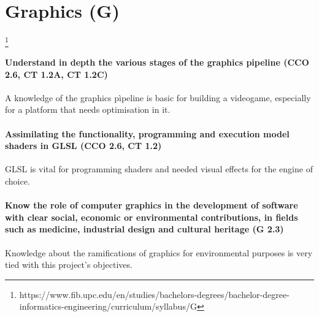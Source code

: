 \section{Graphics (G)}

\footnote{https://www.fib.upc.edu/en/studies/bachelors-degrees/bachelor-degree-informatics-engineering/curriculum/syllabus/G}

\paragraph{Understand in depth the various stages of the graphics pipeline (CCO 2.6, CT 1.2A, CT 1.2C)}
A knowledge of the graphics pìpeline is basic for building a videogame, especially for a platform that needs optimisation in it.

\paragraph{Assimilating the functionality, programming and execution model shaders in GLSL (CCO 2.6, CT 1.2)}
GLSL is vital for programming shaders and needed visual effects for the engine of choice.

\paragraph{Know the role of computer graphics in the development of software with clear social, economic or environmental contributions, in fields such as medicine, industrial design and cultural heritage (G 2.3)}
Knowledge about the ramifications of graphics for environmental purposes is very tied with this project's objectives.
